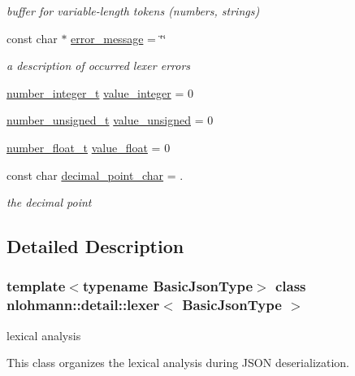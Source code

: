 \begin{DoxyCompactItemize}
\begin{DoxyCompactList}\small\item\em buffer for variable-\/length tokens (numbers, strings) \end{DoxyCompactList}\item 
const char $\ast$ \hyperlink{classnlohmann_1_1detail_1_1lexer_ae2a15e440f1889e0ab0c6a35344e48df}{error\+\_\+message} = \char`\"{}\char`\"{}
\begin{DoxyCompactList}\small\item\em a description of occurred lexer errors \end{DoxyCompactList}\item 
\hyperlink{classnlohmann_1_1detail_1_1lexer_a9cd1b11cc67edbfb2613c788b5bd337c}{number\+\_\+integer\+\_\+t} \hyperlink{classnlohmann_1_1detail_1_1lexer_a353d8eeca5b2f21b3e88540c17afb9bc}{value\+\_\+integer} = 0
\item 
\hyperlink{classnlohmann_1_1detail_1_1lexer_a105d1dfeab414a572655895cdd96a52a}{number\+\_\+unsigned\+\_\+t} \hyperlink{classnlohmann_1_1detail_1_1lexer_af250180459c23ca71c3e10a99fb5ba3e}{value\+\_\+unsigned} = 0
\item 
\hyperlink{classnlohmann_1_1detail_1_1lexer_aa7f9e7b2bcd311fb86e2da43761a6619}{number\+\_\+float\+\_\+t} \hyperlink{classnlohmann_1_1detail_1_1lexer_a861ce804da2d257ee373d1e0b55780e1}{value\+\_\+float} = 0
\item 
const char \hyperlink{classnlohmann_1_1detail_1_1lexer_a16593b0475f6d1cddd5eaf7c045771f3}{decimal\+\_\+point\+\_\+char} = \textquotesingle{}.\textquotesingle{}
\begin{DoxyCompactList}\small\item\em the decimal point \end{DoxyCompactList}\end{DoxyCompactItemize}


\subsection{Detailed Description}
\subsubsection*{template$<$typename Basic\+Json\+Type$>$\newline
class nlohmann\+::detail\+::lexer$<$ Basic\+Json\+Type $>$}

lexical analysis 

This class organizes the lexical analysis during J\+S\+ON deserialization. 

